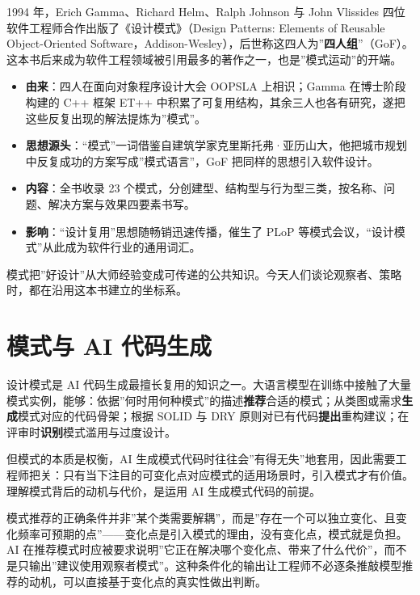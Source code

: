 \documentclass[12pt,a4paper,twoside,openany]{ctexbook}
\numberwithin{figure}{chapter}
\numberwithin{table}{chapter}
\providecommand{\tightlist}{\setlength{\itemsep}{0pt}\setlength{\parskip}{0pt}}
\begin{document}
1994 年，Erich Gamma、Richard Helm、Ralph Johnson 与 John Vlissides
四位软件工程师合作出版了《设计模式》（Design Patterns: Elements of
Reusable Object-Oriented
Software，Addison-Wesley），后世称这四人为''\textbf{四人组}''（GoF）。这本书后来成为软件工程领域被引用最多的著作之一，也是''模式运动''的开端。

\begin{itemize}
\tightlist
\item
  \textbf{由来}：四人在面向对象程序设计大会 OOPSLA 上相识；Gamma
  在博士阶段构建的 C++ 框架 ET++
  中积累了可复用结构，其余三人也各有研究，遂把这些反复出现的解法提炼为''模式''。
\item
  \textbf{思想源头}：``模式''一词借鉴自建筑学家克里斯托弗·亚历山大，他把城市规划中反复成功的方案写成''模式语言''，GoF
  把同样的思想引入软件设计。
\item
  \textbf{内容}：全书收录 23
  个模式，分创建型、结构型与行为型三类，按名称、问题、解决方案与效果四要素书写。
\item
  \textbf{影响}：``设计复用''思想随畅销迅速传播，催生了 PLoP
  等模式会议，``设计模式''从此成为软件行业的通用词汇。
\end{itemize}

模式把''好设计''从大师经验变成可传递的公共知识。今天人们谈论观察者、策略时，都在沿用这本书建立的坐标系。

\section{模式与 AI
代码生成}\label{ux6a21ux5f0fux4e0e-ai-ux4ee3ux7801ux751fux6210}

设计模式是 AI
代码生成最擅长复用的知识之一。大语言模型在训练中接触了大量模式实例，能够：依据''何时用何种模式''的描述\textbf{推荐}合适的模式；从类图或需求\textbf{生成}模式对应的代码骨架；根据
SOLID 与 DRY
原则对已有代码\textbf{提出}重构建议；在评审时\textbf{识别}模式滥用与过度设计。

但模式的本质是权衡，AI
生成模式代码时往往会''有得无失''地套用，因此需要工程师把关：只有当下注目的可变化点对应模式的适用场景时，引入模式才有价值。理解模式背后的动机与代价，是运用
AI 生成模式代码的前提。

模式推荐的正确条件并非''某个类需要解耦''，而是''存在一个可以独立变化、且变化频率可预期的点''------变化点是引入模式的理由，没有变化点，模式就是负担。AI
在推荐模式时应被要求说明''它正在解决哪个变化点、带来了什么代价''，而不是只输出''建议使用观察者模式''。这种条件化的输出让工程师不必逐条推敲模型推荐的动机，可以直接基于变化点的真实性做出判断。
\end{document}
